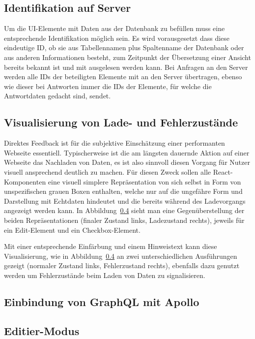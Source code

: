 
\subsection{Identifikation auf Server}
Um die UI-Elemente mit Daten aus der Datenbank zu befüllen muss eine entsprechende Identifikation möglich sein. Es wird vorausgesetzt dass diese eindeutige ID, ob sie aus Tabellennamen plus Spaltenname der Datenbank oder aus anderen Informationen besteht, zum Zeitpunkt der Übersetzung einer Ansicht bereits bekannt ist und mit ausgelesen werden kann. Bei Anfragen an den Server werden alle IDs der beteiligten Elemente mit an den Server übertragen, ebenso wie dieser bei Antworten immer die IDs der Elemente, für welche die Antwortdaten gedacht sind, sendet.

\subsection{Visualisierung von Lade- und Fehlerzustände}
Direktes Feedback ist für die subjektive Einschätzung einer performanten Webseite essentiell. Typischerweise ist die am längsten dauernde Aktion auf einer Webseite das Nachladen von Daten, es ist also sinnvoll diesen Vorgang für Nutzer visuell ansprechend deutlich zu machen. Für diesen Zweck sollen alle React-Komponenten eine visuell simplere Repräsentation von sich selbst in Form von unspezifischen grauen Boxen enthalten, welche nur auf die ungefähre Form und Darstellung mit Echtdaten hindeutet und die bereits während des Ladevorgangs angezeigt werden kann. In Abbildung~\ref{} sieht man eine Gegenüberstellung der beiden Repräsentationen (finaler Zustand links, Ladezustand rechts), jeweils für ein Edit-Element und ein Checkbox-Element.

Mit einer entsprechende Einfärbung und einem Hinweistext kann diese Visualisierung, wie in Abbildung~\ref{} an zwei unterschiedlichen Ausführungen gezeigt (normaler Zustand links, Fehlerzustand rechts), ebenfalls dazu genutzt werden um Fehlerzustände beim Laden von Daten zu signalisieren.

\subsection{Einbindung von GraphQL mit Apollo}

\subsection{Editier-Modus}

